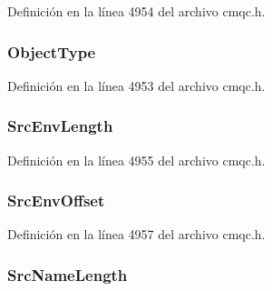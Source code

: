 Definición en la línea 4954 del archivo cmqc.\+h.

\hypertarget{structtag_m_q_r_m_h_a1b4753b4825e88c34bdab97e9277176b}{}
\subsubsection[{Object\+Type}]{ Object\+Type}\label{structtag_m_q_r_m_h_a1b4753b4825e88c34bdab97e9277176b}


Definición en la línea 4953 del archivo cmqc.\+h.

\hypertarget{structtag_m_q_r_m_h_a286e0e177ce771ad66c635b688e91b6a}{}
\subsubsection[{Src\+Env\+Length}]{ Src\+Env\+Length}\label{structtag_m_q_r_m_h_a286e0e177ce771ad66c635b688e91b6a}


Definición en la línea 4955 del archivo cmqc.\+h.

\hypertarget{structtag_m_q_r_m_h_afd4fa1c8f37160669a03b8f52d2269a9}{}
\subsubsection[{Src\+Env\+Offset}]{ Src\+Env\+Offset}\label{structtag_m_q_r_m_h_afd4fa1c8f37160669a03b8f52d2269a9}


Definición en la línea 4957 del archivo cmqc.\+h.

\hypertarget{structtag_m_q_r_m_h_abb6541ecffc934fffb2a1f23ac0fed0a}{}
\subsubsection[{Src\+Name\+Length}]{ Src\+Name\+Length}\label{structtag_m_q_r_m_h_abb6541ecffc934fffb2a1f23ac0fed0a}


